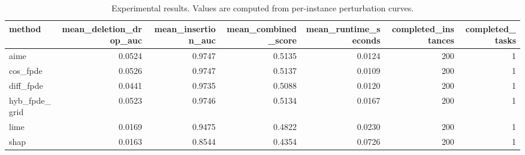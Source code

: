 \begin{table}[t]
\caption{Experimental results. Values are computed from per-instance perturbation curves.}
\label{tab:main_results_computed}
\centering
\begin{tabular}{lrrrrrr}
\toprule
method & mean\_deletion\_drop\_auc & mean\_insertion\_auc & mean\_combined\_score & mean\_runtime\_seconds & completed\_instances & completed\_tasks \\
\midrule
aime & 0.0524 & 0.9747 & 0.5135 & 0.0124 & 200 & 1 \\
cos\_fpde & 0.0526 & 0.9747 & 0.5137 & 0.0109 & 200 & 1 \\
diff\_fpde & 0.0441 & 0.9735 & 0.5088 & 0.0120 & 200 & 1 \\
hyb\_fpde\_grid & 0.0523 & 0.9746 & 0.5134 & 0.0167 & 200 & 1 \\
lime & 0.0169 & 0.9475 & 0.4822 & 0.0230 & 200 & 1 \\
shap & 0.0163 & 0.8544 & 0.4354 & 0.0726 & 200 & 1 \\
\bottomrule
\end{tabular}

\end{table}
